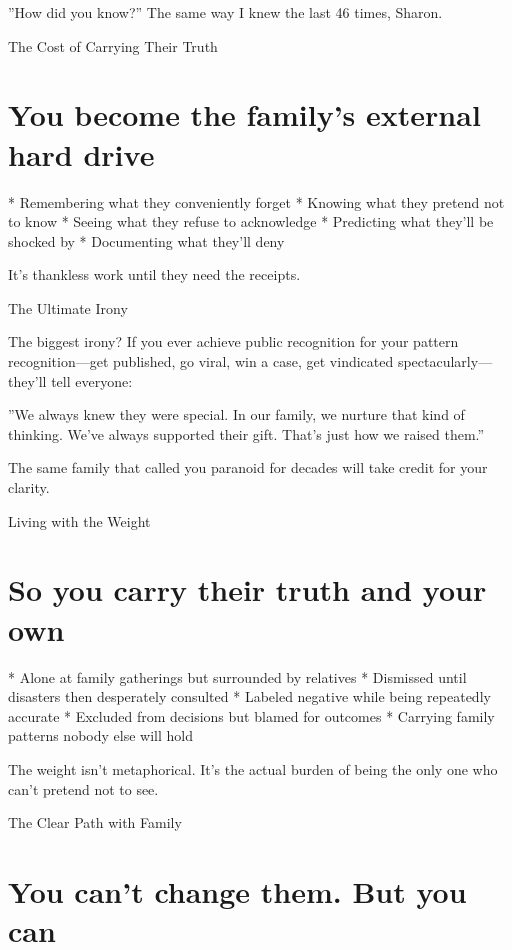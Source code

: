 \documentclass[12pt,oneside]{book}
\begin{document}
''How did you know?'' The same way I knew the last 46 times, Sharon.

The Cost of Carrying Their Truth

\section{You become the family's external hard drive}

                    * Remembering what they conveniently forget
                    * Knowing what they pretend not to know
                    * Seeing what they refuse to acknowledge
                    * Predicting what they'll be shocked by
                    * Documenting what they'll deny

It's thankless work until they need the receipts.

The Ultimate Irony

The biggest irony? If you ever achieve public recognition for your pattern recognition---get published, go viral, win a case, get vindicated spectacularly---they'll tell everyone:

''We always knew they were special. In our family, we nurture that kind of thinking. We've always supported their gift. That's just how we raised them.''

The same family that called you paranoid for decades will take credit for your clarity.

Living with the Weight

\section{So you carry their truth and your own}

                    * Alone at family gatherings but surrounded by relatives
                    * Dismissed until disasters then desperately consulted
                    * Labeled negative while being repeatedly accurate
                    * Excluded from decisions but blamed for outcomes
                    * Carrying family patterns nobody else will hold

The weight isn't metaphorical. It's the actual burden of being the only one who can't pretend not to see.

The Clear Path with Family

\section{You can't change them. But you can}
\end{document}
